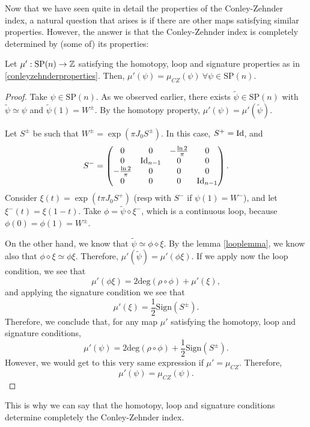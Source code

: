 Now that we have seen quite in detail the properties of the Conley-Zehnder index, a natural question that arises is if there are other maps satisfying similar properties. However, the answer is that the Conley-Zehnder index is completely determined by (some of) its properties:

\begin{theo} Let $\mu' : \text{SP}(n) \rightarrow \mathbb{Z}$ satisfying the homotopy, loop and signature properties as in \ref{conleyzehnderproperties}. Then, $\mu'(\psi) = \mu_{CZ}(\psi) \ \forall \psi \in \text{SP}(n)$.
\end{theo}

\begin{proof}
Take $\psi \in \text{SP}(n)$. As we observed earlier, there exists $\widetilde{\psi} \in \text{SP}(n)$ with $\widetilde{\psi} \simeq \psi$ and $\widetilde{\psi}(1) = W^{\pm}$. By the homotopy property, $\mu'(\psi) = \mu'(\widetilde{\psi})$.

Let $S^{\pm}$ be such that $W^{\pm} = \exp(\pi J_0S^{\pm})$. In this case, $S^+=\mathrm{Id}$, and
\[S^- = \begin{pmatrix} 0 & 0 & -\frac{\ln 2}{\pi} & 0 \\ 0 & \mathrm{Id}_{n-1} & 0 & 0 \\ -\frac{\ln 2}{\pi} & 0 & 0 & 0 \\ 0 & 0 & 0 & \mathrm{Id}_{n-1} \end{pmatrix} .\]
Consider $\xi(t) = \exp(t\pi J_0S^+)$ (resp with $S^-$ if $\psi(1)=W^-$), and let $\xi^-(t) = \xi(1-t)$. Take $\phi = \widetilde{\psi} \diamond \xi^-$, which is a continuous loop, because $\phi(0) = \phi(1) = W^{\pm}$.

On the other hand, we know that $\widetilde{\psi} \simeq \phi \diamond \xi$. By the lemma \ref{looplemma}, we know also that $\phi \diamond \xi \simeq \phi\xi$. Therefore, $\mu'(\widetilde{\psi}) = \mu'(\phi\xi)$. If we apply now the loop condition, we see that
\[\mu'(\phi\xi) = 2\text{deg}(\rho \circ \phi) + \mu'(\xi) ,\]
and applying the signature condition we see that
\[\mu'(\xi) = \frac12 \mathrm{Sign}(S^{\pm}) .\]
Therefore, we conclude that, for any map $\mu'$ satisfying the homotopy, loop and signature conditions,
\[\mu'(\psi) = 2\text{deg}(\rho \circ \phi) + \frac12 \mathrm{Sign}(S^{\pm}).\]
However, we would get to this very same expression if $\mu'=\mu_{CZ}$. Therefore,
\[\mu'(\psi) = \mu_{CZ}(\psi) .\]
\end{proof}

This is why we can say that the homotopy, loop and signature conditions determine completely the Conley-Zehnder index.
